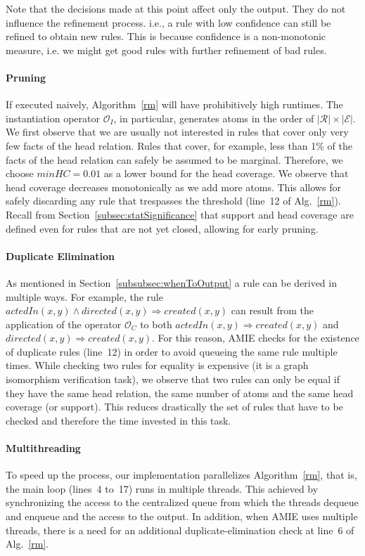 Note that the decisions made at this point affect only the output. They do not influence the refinement process. i.e., a rule with low confidence can still be refined to obtain new rules.
This is because confidence is a non-monotonic measure, i.e. we might get good rules with further refinement of bad rules.




\paragraph{Pruning}
If executed naively, Algorithm~\ref{rm} will have prohibitively high runtimes.
The instantiation operator $\mathcal{O}_I$, in particular, generates atoms in the order of $|\mathcal{R}| \times |\mathcal{E}|$.
We first observe that we are usually not interested in rules that cover only very few facts of the head relation.
Rules that cover, for example, less than 1\% of the facts of the head relation can safely be assumed to be marginal.
Therefore, we choose $minHC=0.01$ as a lower bound for the head coverage. We observe that head coverage decreases monotonically as we add more atoms.
This allows for safely discarding any rule that trespasses the threshold (line~12 of Alg.~\ref{rm}).
Recall from Section~\ref{subsec:statSignificance} that support and head coverage are defined even for rules that are not yet closed, allowing for early pruning.

\paragraph{Duplicate Elimination} \label{subsec:duplicateElimination}
As mentioned in Section~\ref{subsubsec:whenToOutput} a rule can be derived in multiple ways.
For example, the rule $actedIn(x,y) \wedge directed(x,y) \Rightarrow created(x,y)$ can result from the application
of the operator $\mathcal{O}_C$ to both $actedIn(x,y) \Rightarrow created(x,y)$ and $directed(x,y) \Rightarrow created(x,y)$.
For this reason, AMIE checks for the existence of duplicate rules (line~12) in order to avoid queueing the same rule multiple times.
While checking two rules for equality is expensive (it is a graph isomorphism verification task), 
we observe that two rules can only be equal if they have the same head relation, the same number of atoms and
the same head coverage (or support). This reduces drastically the set of rules that have to be checked and therefore
the time invested in this task.


\paragraph{Multithreading}
To speed up the process, our implementation parallelizes Algorithm~\ref{rm}, that is, the main loop (lines~4 to~17) runs in multiple threads. 
This achieved by synchronizing the access to the centralized queue from which the threads dequeue and enqueue and the access to the output.
In addition, when AMIE uses multiple threads, there is a need for an additional duplicate-elimination check at line~6 of Alg.~\ref{rm}. 

